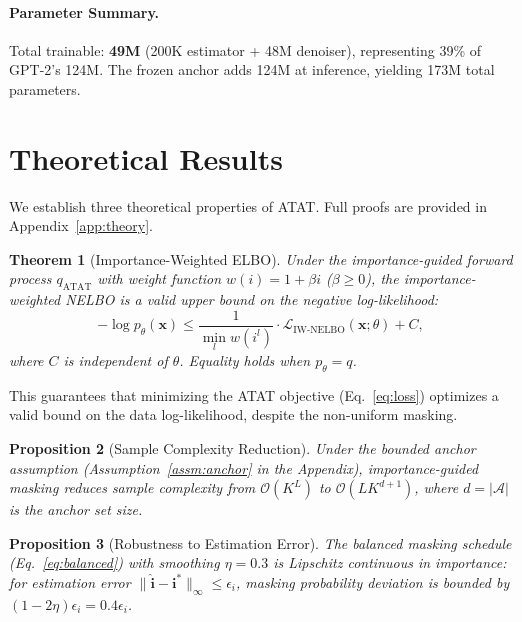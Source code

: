 \documentclass[11pt]{article}
\newcommand{\gA}{\mathcal{A}}
\newcommand{\gL}{\mathcal{L}}
\newcommand{\gO}{\mathcal{O}}
\newcommand{\rvx}{\mathbf{x}}
\newcommand{\rvi}{\mathbf{i}}
\newtheorem{theorem}{Theorem}[section]
\newtheorem{proposition}[theorem]{Proposition}
\theoremstyle{remark}
\begin{document}
\paragraph{Parameter Summary.} Total trainable: \textbf{49M} (200K estimator + 48M denoiser), representing 39\% of GPT-2's 124M. The frozen anchor adds 124M at inference, yielding 173M total parameters.

\section{Theoretical Results}
\label{sec:theory}

We establish three theoretical properties of ATAT. Full proofs are provided in Appendix~\ref{app:theory}.

\begin{theorem}[Importance-Weighted ELBO]
\label{thm:iw-elbo}
Under the importance-guided forward process $q_{\text{ATAT}}$ with weight function $w(i) = 1 + \beta i$ ($\beta \geq 0$), the importance-weighted NELBO is a valid upper bound on the negative log-likelihood:
\begin{equation}
    -\log p_\theta(\rvx) \leq \frac{1}{\min_l w(i^l)} \cdot \gL_{\text{IW-NELBO}}(\rvx;\theta) + C,
\end{equation}
where $C$ is independent of $\theta$. Equality holds when $p_\theta = q$.
\end{theorem}

This guarantees that minimizing the ATAT objective (Eq.~\ref{eq:loss}) optimizes a valid bound on the data log-likelihood, despite the non-uniform masking.

\begin{proposition}[Sample Complexity Reduction]
\label{prop:complexity}
Under the bounded anchor assumption (Assumption~\ref{assm:anchor} in the Appendix), importance-guided masking reduces sample complexity from $\gO(K^L)$ to $\gO(LK^{d+1})$, where $d = |\gA|$ is the anchor set size.
\end{proposition}

\begin{proposition}[Robustness to Estimation Error]
\label{prop:robustness}
The balanced masking schedule (Eq.~\ref{eq:balanced}) with smoothing $\eta=0.3$ is Lipschitz continuous in importance: for estimation error $\|\hat{\rvi} - \rvi^*\|_\infty \leq \epsilon_i$, masking probability deviation is bounded by $(1{-}2\eta)\epsilon_i = 0.4\epsilon_i$.
\end{proposition}
\end{document}
